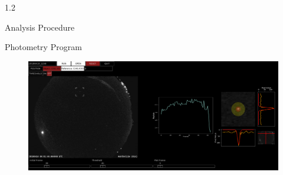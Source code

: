 \documentclass[final]{beamer}
\newlength{\twocolwid}
\begin{document}
\begin{frame}[t]
\begin{columns}[t]
\begin{column}{1.2\twocolwid}
\begin{alertblock}{Analysis Procedure}
\begin{figure}
\begin{subfigure}{.5\textwidth}
  \label{fig:gaussians}
\end{subfigure}
\end{figure}
\vspace{-1cm}
\end{alertblock}


\begin{alertblock}{Photometry Program}
\begin{figure}
	\centering
	\includegraphics[width=\linewidth]{ProgramLandscape.png}
	\label{fig:}
\end{figure}
\vspace{-1.5cm}
\end{alertblock}









\end{column}
\end{columns}
\end{frame}
\end{document}
